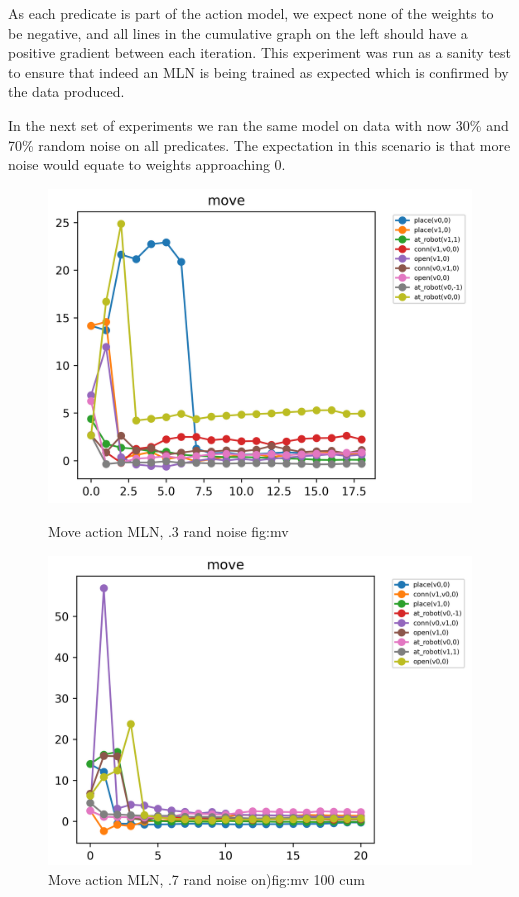 As each predicate is part of the action model, we expect none of the weights to be negative, and all lines in the cumulative graph on the left should have a positive gradient between each iteration.
This experiment was run as a sanity test to ensure that indeed an MLN is being trained as expected which is confirmed by the data produced.

In the next set of experiments we ran the same model on data with now 30\% and 70\% random noise on all predicates.
The expectation in this scenario is that more noise would equate to weights approaching 0.
\begin{figure}[h]
 \centering
 \begin{minipage}[b]{0.49\linewidth}
 \includegraphics[width=1\textwidth]{images/tests/movegraph_rand_70}
 \caption{Move action MLN, .3 rand noise {fig:mv}}

 \end{minipage}
 \hfill
 \begin{minipage}[b]{0.49\linewidth}

 \includegraphics[width=1\textwidth]{images/tests/movegraph_rand_30}
 \caption{Move action MLN, .7 rand noise on){fig:mv 100 cum}}

 \end{minipage}
\end{figure}

